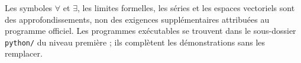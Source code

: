 Les symboles $\forall$ et $\exists$, les limites formelles, les séries et les
espaces vectoriels sont des approfondissements, non des exigences supplémentaires
attribuées au programme officiel. Les programmes exécutables se trouvent dans
le sous-dossier \texttt{python/} du niveau première ; ils complètent les démonstrations sans les remplacer.
